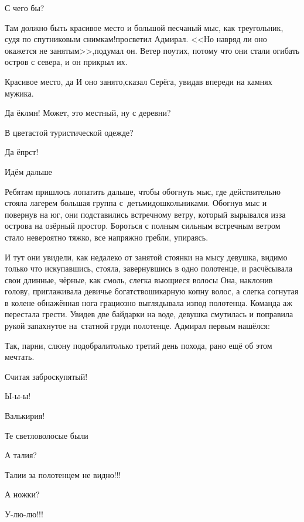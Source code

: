 \diagdash С чего бы?

\diagdash Там должно быть красивое место и большой песчаный мыс, как треугольник, судя по спутниковым снимкам!\mdash просветил Адмирал. <<Но навряд ли оно окажется не занятым>>,\mdash подумал он. Ветер поутих, потому что они стали огибать остров с севера, и он прикрыл их.

\diagdash Красивое место, да\myldots{} И оно занято,\mdash сказал Серёга, увидав впереди на камнях мужика.

\diagdash Да ёклмн! Может, это местный, ну с деревни?

\diagdash В цветастой туристической одежде?

\diagdash Да ёпрст!

\diagdash Идём дальше\myldots{}  %

\newpage

Ребятам пришлось лопатить дальше, чтобы обогнуть мыс, где действительно стояла лагерем большая группа с~детьми\sdash дошкольниками. Обогнув мыс и повернув на юг, они подставились встречному ветру, который вырывался из\sdash за острова на озёрный простор. Бороться с полным сильным встречным ветром стало невероятно тяжко, все напряжно гребли, упираясь.



И тут они увидели, как недалеко от занятой стоянки на мысу девушка, видимо только что искупавшись, стояла, завернувшись в одно полотенце, и расчёсывала свои длинные, чёрные, как смоль, слегка вьющиеся волосы\myldots{} Она, наклонив голову, приглаживала девичье богатство\mdash шикарную копну волос, а слегка согнутая в колене обнажённая нога грациозно выглядывала из\sdash под полотенца. Команда аж перестала грести. Увидев две байдарки на воде, девушка смутилась и поправила рукой запахнутое на~статной груди полотенце. Адмирал первым нашёлся:

\diagdash Так, парни, слюну подобрали\mdash только третий день похода, рано ещё об этом мечтать.

\diagdash Считая заброску\mdash пятый!

\diagdash Ы-ы-ы!

\diagdash Валькирия!

\diagdash Те светловолосые были\myldots{}

\diagdash А талия?

\diagdash Талии за полотенцем не видно!!!

\diagdash А ножки?

\diagdash У-лю-лю!!!

